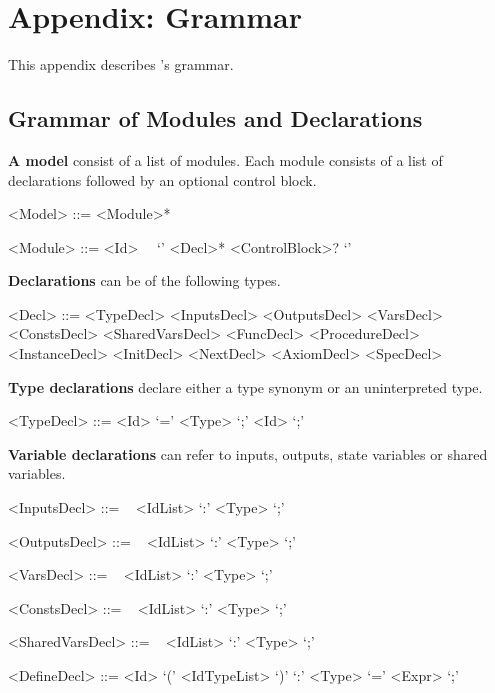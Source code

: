 \chapter{Appendix: \uclid{} Grammar}

\newcommand{\paratitle}[1]{\textsf{\textbf{#1}}}
\newcommand{\nonterminal}[1]{$\langle \textit{#1} \rangle$}

\setlength{\grammarindent}{12em} %

This appendix describes \uclid{}'s grammar.

\section{Grammar of Modules and Declarations}
\paratitle{A model} consist of a list of modules. Each module consists of a list of declarations followed by an optional control block.
\begin{grammar}
     <Model> ::= <Module>*

     <Module> ::=  <Id>~~ `{' <Decl>* <ControlBlock>? `}'
\end{grammar}

\paratitle{Declarations} can be of the following types.
\begin{grammar}
     <Decl> ::= <TypeDecl> 
            \alt <InputsDecl> 
            \alt <OutputsDecl> 
            \alt <VarsDecl> 
            \alt <ConstsDecl> 
            \alt <SharedVarsDecl> 
            \alt <FuncDecl> 
            \alt <ProcedureDecl> 
            \alt <InstanceDecl>
            \alt <InitDecl> 
            \alt <NextDecl> 
            \alt <AxiomDecl>
            \alt <SpecDecl> 
\end{grammar}

\paratitle{Type declarations} declare either a type synonym or an uninterpreted type.
\begin{grammar}
     <TypeDecl> ::=  <Id> `=' <Type> `;'
              \alt {} <Id> `;'

\end{grammar}

\paratitle{Variable declarations} can refer to inputs, outputs, state variables or shared variables.
\begin{grammar}
     <InputsDecl> ::=
        ~ <IdList> `:' <Type> `;'

     <OutputsDecl> ::=
        ~ <IdList> `:' <Type> `;'

     <VarsDecl> ::=
        ~ <IdList> `:' <Type> `;'

     <ConstsDecl> ::=
        ~ <IdList> `:' <Type> `;'

     <SharedVarsDecl> ::=
        ~ <IdList> `:' <Type> `;'

     <DefineDecl> ::= 
        <Id> `(' <IdTypeList> `)' `:' <Type> `=' <Expr>  `;'

\end{grammar}

